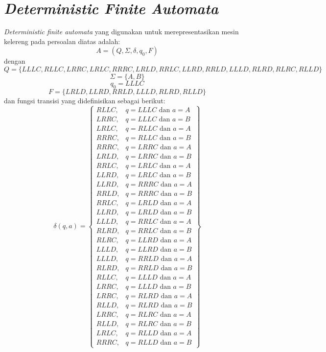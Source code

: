 \documentclass[a4paper,titlepage]{article}
\begin{document}
	\section{\textit{Deterministic Finite Automata}}

		\textit{Deterministic finite automata} yang digunakan untuk merepresentasikan mesin kelereng pada persoalan diatas adalah:
		\[A = (Q, \Sigma, \delta, q_0, F)\]
		dengan
		\[Q = \{LLLC, RLLC, LRRC, LRLC, RRRC, LRLD, RRLC, LLRD, RRLD, LLLD, RLRD, RLRC, RLLD\}\]
		\[\Sigma = \{A, B\}\]
		\[q_0 = LLLC\]
		\[F = \{LRLD, LLRD, RRLD, LLLD, RLRD, RLLD\}\]
		dan fungsi transisi yang didefinisikan sebagai berikut:
		\[
			\delta(q, a) = \left\{
				\begin{array}{lr}
					RLLC, & q = LLLC \text{ dan } a = A\\
					LRRC, & q = LLLC \text{ dan } a = B\\
					LRLC, & q = RLLC \text{ dan } a = A\\
					RRRC, & q = RLLC \text{ dan } a = B\\
					RRRC, & q = LRRC \text{ dan } a = A\\
					LRLD, & q = LRRC \text{ dan } a = B\\
					RRLC, & q = LRLC \text{ dan } a = A\\
					LLRD, & q = LRLC \text{ dan } a = B\\
					LLRD, & q = RRRC \text{ dan } a = A\\
					RRLD, & q = RRRC \text{ dan } a = B\\
					RRLC, & q = LRLD \text{ dan } a = A\\
					LLRD, & q = LRLD \text{ dan } a = B\\
					LLLD, & q = RRLC \text{ dan } a = A\\
					RLRD, & q = RRLC \text{ dan } a = B\\
					RLRC, & q = LLRD \text{ dan } a = A\\
					LLLD, & q = LLRD \text{ dan } a = B\\
					LLLD, & q = RRLD \text{ dan } a = A\\
					RLRD, & q = RRLD \text{ dan } a = B\\
					RLLC, & q = LLLD \text{ dan } a = A\\
					LRRC, & q = LLLD \text{ dan } a = B\\
					LRRC, & q = RLRD \text{ dan } a = A\\
					RLLD, & q = RLRD \text{ dan } a = B\\
					LRRC, & q = RLRC \text{ dan } a = A\\
					RLLD, & q = RLRC \text{ dan } a = B\\
					LRLC, & q = RLLD \text{ dan } a = A\\
					RRRC, & q = RLLD \text{ dan } a = B
				\end{array}
			\right\}
		\]
\end{document}
